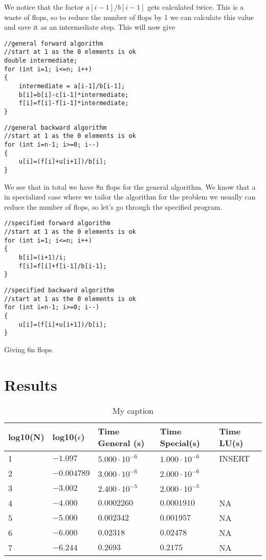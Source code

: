\documentclass[a4paper,11pt]{article}
\begin{document}
{We notice that the factor $a[i-1]/b[i-1]$ gets calculated twice. This is a waste of flops, so to reduce the number of flops by 1 we can calculate this value and save it as an intermediate step. This will now give

\begin{lstlisting}
//general forward algorithm
//start at 1 as the 0 elements is ok
double intermediate; 
for (int i=1; i<=n; i++)
{
	intermediate = a[i-1]/b[i-1];
	b[i]=b[i]-c[i-1]*intermediate;
	f[i]=f[i]-f[i-1]*intermediate;
}
\end{lstlisting}

\begin{lstlisting}
//general backward algorithm
//start at 1 as the 0 elements is ok
for (int i=n-1; i>=0; i--)
{
	u[i]=(f[i]+u[i+1])/b[i];
}
\end{lstlisting}

We see that in total we have 8n flops for the general algorithm. We know that a in specialized case where we tailor the algorithm for the problem we usually can reduce the number of flops, so let's go through the specified program. 

\begin{lstlisting}
//specified forward algorithm
//start at 1 as the 0 elements is ok
for (int i=1; i<=n; i++)
{
	b[i]=(i+1)/i;
	f[i]=f[i]+f[i-1]/b[i-1];
}
\end{lstlisting}

\begin{lstlisting}
//specified backward algorithm
//start at 1 as the 0 elements is ok
for (int i=n-1; i>=0; i--)
{
	u[i]=(f[i]+u[i+1])/b[i];
}
\end{lstlisting}

Giving 6n flops. 

\section*{Results}

\begin{table}[]
\centering
\caption{My caption}
\label{my-label}
\begin{tabular}{|lllll|} 
log10(N) & log10($\epsilon$) & Time General (s)     & Time Special(s)      & Time LU(s) \\
\hline 
1        & $-1.097$          & $5.000\cdot 10^{-6}$ & $1.000\cdot 10^{-6}$ & INSERT     \\
2        & $-0.004789$       & $3.000\cdot 10^{-6}$ & $2.000\cdot 10^{-6}$ &            \\
3        &  $-3.002$       & $2.400\cdot 10^{-5}$ & $2.000\cdot 10^{-5}$ &            \\
4        & $-4.000$          & 		$0.0002260$ 	& $0.0001910$			&   NA       \\
5        &   $-5.000$        &      $0.002342$	    &  $0.001957$	      &   NA       \\
6        &   $-6.000$         &      $0.02318$	    &  $0.02478$	        &   NA       \\
7        &   $-6.244$         &      $0.2693$	     &  $0.2175$	        &   NA      	\\  
\hline
\end{tabular}
\end{table}


}
\end{document}

